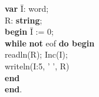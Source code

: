 \documentclass{article}
\begin{document}
\begin{tabbing}
\textbf{var} \=I: word;\\
\>R: \textbf{string};\\

\textbf{begin} \=I := 0;\\
\>\textbf{while} \=\textbf{not} eof \textbf{do begin}\\
\>\>readln(R); Inc(I);\\
\>\>writeln(I:5, ' ', R)\\
\>\textbf{end}\\
\textbf{end}.

\end{tabbing}
\end{document}
